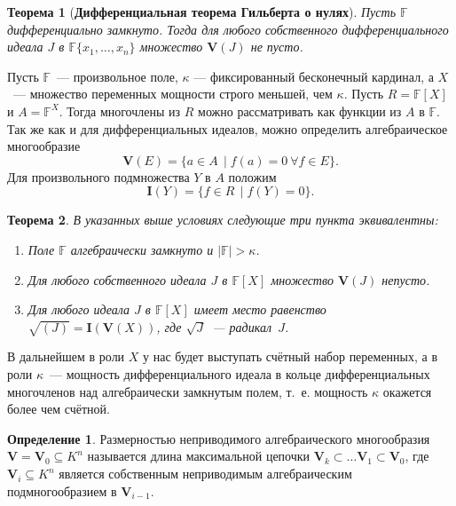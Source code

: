 \documentclass[16pt]{article}
\theoremstyle{plain1}
\theoremstyle{plain2}
\theoremstyle{plain}
\newtheorem{theorem}{Теорема}
\theoremstyle{plain3}
\theoremstyle{definition}
\newtheorem{definition}[theorem2]{Определение}
\theoremstyle{remark}
\begin{document}
\begin{theorem}[\bf Дифференциальная теорема Гильберта о нулях]\label{theorem:th 0 for dif}
Пусть $\mathbb{F}$ дифференциально замкнуто. Тогда для любого собственного дифференциального идеала $J$ в
$\mathbb{F}\{x_1,\ldots,x_n\}$ множество $\mathbf{V}(J)$ не пусто. \cite[Chapter~IV,
Section~2, Theorem~1]{Kolchin 2}
\end{theorem}

Пусть $\mathbb{F}$~--- произвольное поле, $\kappa$ --- фиксированный
бесконечный кардинал, а $X$~--- множество переменных мощности строго
меньшей, чем $\kappa$. Пусть $R=\mathbb{F}[X]$ и $A=\mathbb{F}^X$. Тогда многочлены из
$R$ можно рассматривать как функции из $A$ в $\mathbb{F}$. Так же как и для
дифференциальных идеалов, можно определить алгебраическое многообразие $$\mathbf{V}(E)=\{a\in A\,
\mid f(a)=0~\forall f\in E\}.$$ Для произвольного подмножества $Y$
в $A$ положим
$$
 \mathbf{I}(Y)=\{f \in R\, \mid f(Y)=0\}.
$$

\begin{theorem}\label{theorem:th 0 for alg}
В указанных выше условиях следующие три пункта эквивалентны:

\begin{enumerate}
\item Поле $\mathbb{F}$ алгебраически замкнуто и $|\mathbb{F}|>\kappa$.

\item Для любого собственного идеала $J$ в $\mathbb{F}[X]$ множество
$\mathbf{V}(J)$ непусто.

\item Для любого идеала $J$ в $\mathbb{F}[X]$ имеет место равенство
$\sqrt{(J)}=\mathbf{I}(\mathbf{V}(X))$, где $\sqrt{J}$~--- радикал~$J$.
\end{enumerate}
\cite[Section~1, Theorem]{Lang}
\end{theorem}

В дальнейшем в роли $X$ у нас будет выступать счётный набор
переменных, а в роли $\kappa$~--- мощность дифференциального идеала
в кольце дифференциальных многочленов
над алгебраически замкнутым полем, т.~е. мощность $\kappa$
окажется более чем счётной.


\begin{definition} Размерностью неприводимого алгебраического многообразия
$\mathbf{V}=\mathbf{V}_0\subseteq K^n$ называется длина максимальной цепочки
$\mathbf{V}_k\subset\ldots\mathbf{V}_1\subset\mathbf{V}_0$, где
$\mathbf{V}_i\subseteq K^n$ является собственным неприводимым алгебраическим подмногообразием
в $\mathbf{V}_{i-1}$.
\end{definition}
\end{document}
